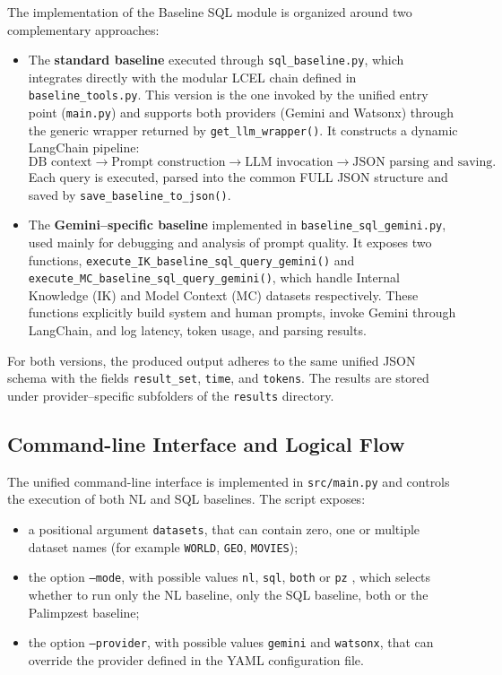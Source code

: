 \documentclass[12pt,a4paper]{article}
\begin{document}
The implementation of the Baseline SQL module is organized around two complementary
approaches:

\begin{itemize}
  \item The \textbf{standard baseline} executed through \texttt{sql\_baseline.py}, which
  integrates directly with the modular LCEL chain defined in
  \texttt{baseline\_tools.py}. This version is the one invoked by the unified entry
  point (\texttt{main.py}) and supports both providers (Gemini and Watsonx) through
  the generic wrapper returned by \texttt{get\_llm\_wrapper()}.
  It constructs a dynamic LangChain pipeline:
  \[
  \text{DB context} \rightarrow \text{Prompt construction} \rightarrow
  \text{LLM invocation} \rightarrow \text{JSON parsing and saving.}
  \]
  Each query is executed, parsed into the common FULL JSON structure and saved by
  \texttt{save\_baseline\_to\_json()}.

  \item The \textbf{Gemini–specific baseline} implemented in
  \texttt{baseline\_sql\_gemini.py}, used mainly for debugging and analysis of
  prompt quality. It exposes two functions,
  \texttt{execute\_IK\_baseline\_sql\_query\_gemini()} and
  \texttt{execute\_MC\_baseline\_sql\_query\_gemini()}, which handle Internal
  Knowledge (IK) and Model Context (MC) datasets respectively. These functions
  explicitly build system and human prompts, invoke Gemini through LangChain,
  and log latency, token usage, and parsing results.
\end{itemize}

For both versions, the produced output adheres to the same unified JSON schema with
the fields \texttt{result\_set}, \texttt{time}, and \texttt{tokens}. The results are
stored under provider–specific subfolders of the \texttt{results} directory.

\subsection{Command-line Interface and Logical Flow}

The unified command-line interface is implemented in \texttt{src/main.py} and
controls the execution of both NL and SQL baselines. The script exposes:

\begin{itemize}
  \item a positional argument \texttt{datasets}, that can contain zero, one or
  multiple dataset names (for example \texttt{WORLD}, \texttt{GEO},
  \texttt{MOVIES});
  \item the option \texttt{--mode}, with possible values \texttt{nl},
  \texttt{sql}, \texttt{both} or \texttt{pz} , which selects whether to run only the NL
  baseline, only the SQL baseline, both or the Palimpzest baseline;
  \item the option \texttt{--provider}, with possible values \texttt{gemini}
  and \texttt{watsonx}, that can override the provider defined in the YAML
  configuration file.
\end{itemize}
\end{document}
